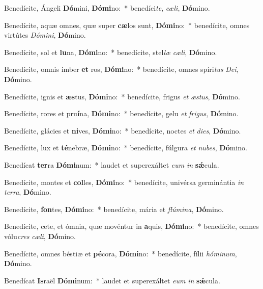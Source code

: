 \item Benedícite, Ángeli \textbf{Dó}mini, \textbf{Dó}\textbf{mi}no:~* benedíci\textit{te}, \textit{cæ}\textit{li}, \textbf{Dó}mino.
\item Benedícite, aquæ omnes, quæ super \textbf{cæ}los sunt, \textbf{Dó}\textbf{mi}no:~* benedícite, omnes virtútes \textit{Dó}\textit{mi}\textit{ni}, \textbf{Dó}mino.
\item Benedícite, sol et \textbf{lu}na, \textbf{Dó}\textbf{mi}no:~* benedícite, stel\textit{læ} \textit{cæ}\textit{li}, \textbf{Dó}mino.
\item Benedícite, omnis imber \textbf{et} ros, \textbf{Dó}\textbf{mi}no:~* benedícite, omnes spíri\textit{tus} \textit{De}\textit{i}, \textbf{Dó}mino.
\item Benedícite, ignis et \textbf{æs}tus, \textbf{Dó}\textbf{mi}no:~* benedícite, frigus \textit{et} \textit{æs}\textit{tus}, \textbf{Dó}mino.
\item Benedícite, rores et pru\textbf{í}na, \textbf{Dó}\textbf{mi}no:~* benedícite, gelu \textit{et} \textit{fri}\textit{gus}, \textbf{Dó}mino.
\item Benedícite, glácies et \textbf{ni}ves, \textbf{Dó}\textbf{mi}no:~* benedícite, noctes \textit{et} \textit{di}\textit{es}, \textbf{Dó}mino.
\item Benedícite, lux et \textbf{té}nebræ, \textbf{Dó}\textbf{mi}no:~* benedícite, fúlgura \textit{et} \textit{nu}\textit{bes}, \textbf{Dó}mino.
\item Benedícat \textbf{ter}ra \textbf{Dó}\textbf{mi}num:~* laudet et superexáltet \textit{e}\textit{um} \textit{in} \textbf{sǽ}cula.
\item Benedícite, montes et \textbf{col}les, \textbf{Dó}\textbf{mi}no:~* benedícite, univérsa germinántia \textit{in} \textit{ter}\textit{ra}, \textbf{Dó}mino.
\item Benedícite, \textbf{fon}tes, \textbf{Dó}\textbf{mi}no:~* benedícite, mária et \textit{flú}\textit{mi}\textit{na}, \textbf{Dó}mino.
\item Benedícite, cete, et ómnia, quæ movéntur in \textbf{a}quis, \textbf{Dó}\textbf{mi}no:~* benedícite, omnes vólu\textit{cres} \textit{cæ}\textit{li}, \textbf{Dó}mino.
\item Benedícite, omnes béstiæ et \textbf{pé}cora, \textbf{Dó}\textbf{mi}no:~* benedícite, fílii \textit{hó}\textit{mi}\textit{num}, \textbf{Dó}mino.
\item Benedícat \textbf{Is}raël \textbf{Dó}\textbf{mi}num:~* laudet et superexáltet \textit{e}\textit{um} \textit{in} \textbf{sǽ}cula.
